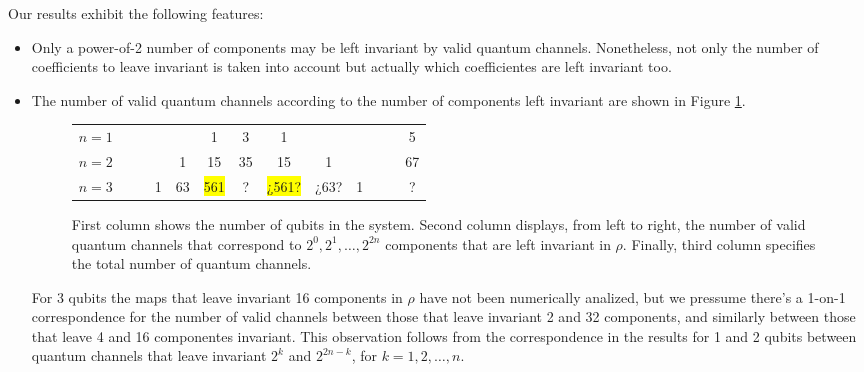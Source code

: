 \documentclass[11pt,dvipsnames]{article}
\begin{document}
Our results exhibit the following features:
\begin{itemize}
\item Only a power-of-2 number of components may be left invariant by valid
			quantum channels. Nonetheless,
			not only the number of 
			coefficients to leave invariant is taken into account but actually
			which coefficientes are left invariant too.

\item 
The number of valid quantum channels according to the number of components
left invariant are shown in Figure \ref{fig:CCs-by-components}.

\begin{figure}[H]
	\centering
		\begin{tabular}{>{$n=}l<{$\hfill}*{12}{c}}
			1 &&&&&1&3&1&&&&&5\\
			2 &&&&1&15&35&15&1&&&&67\\
			3 &&&1&\colorbox{RedOrange}{63}&\colorbox{Yellow}{561}&?&\colorbox{Yellow}{¿561?}&
				\colorbox{RedOrange}{¿63?}&1&&&?
			\end{tabular}
			\caption{First column shows the number of qubits in the system. 
							Second column displays, from left to right, the number of valid 
							quantum channels that correspond to 
							$2^0, 2^1, \ldots, 2^{2n}$ components that are 
							left invariant in $\rho$. Finally, third column specifies the 
							total number of quantum channels.}
			\label{fig:CCs-by-components}
\end{figure} 

For 3 qubits the maps that leave invariant 16 components in $\rho$
have not been numerically analized, but we pressume there's a 
1-on-1 correspondence for the number of valid channels between those that leave
invariant 2 and 32 components, and similarly between those that leave 4 and 16
componentes invariant. This observation follows 
from the correspondence in the results for 1 and 2 qubits 
between quantum channels that leave invariant $2^k$ and $2^{2n-k}$, for 
$k=1, 2, \ldots, n$.
		


\end{itemize}
\end{document}

